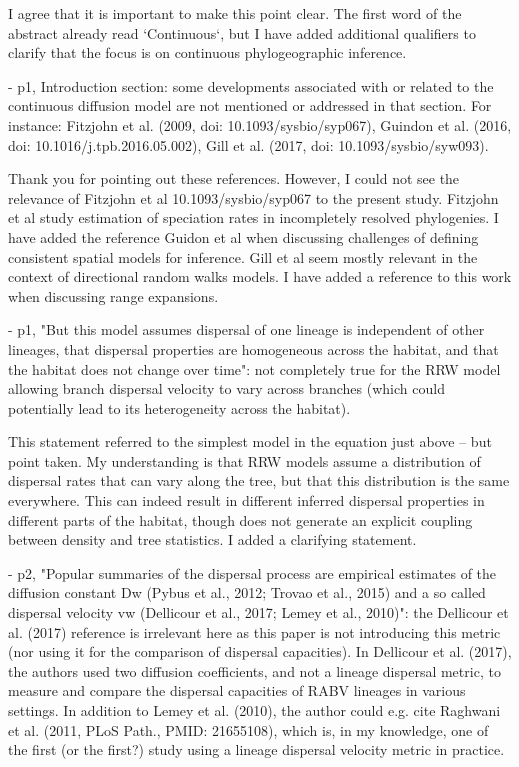 \documentclass[11pt, oneside]{article}   	%
\newcommand{\response}[1]{{\color{black}{\bf Response:} #1}}
\begin{document}
\response{I agree that it is important to make this point clear. The first word of the abstract already read `Continuous`, but I have added additional qualifiers to clarify that the focus is on continuous phylogeographic inference.}

- p1, Introduction section: some developments associated with or related to the continuous diffusion model are not mentioned or addressed in that section. For instance: Fitzjohn et al. (2009, doi: 10.1093/sysbio/syp067), Guindon et al. (2016, doi: 10.1016/j.tpb.2016.05.002), Gill et al. (2017, doi: 10.1093/sysbio/syw093).

\response{Thank you for pointing out these references. However, I could not see the relevance of Fitzjohn et al 10.1093/sysbio/syp067 to the present study. Fitzjohn et al study estimation of speciation rates in incompletely resolved phylogenies. I have added the reference Guidon et al when discussing challenges of defining consistent spatial models for inference. Gill et al seem mostly relevant in the context of directional random walks models. I have added a reference to this work when discussing range expansions.}

- p1, "But this model assumes dispersal of one lineage is independent of other lineages, that dispersal properties are homogeneous across the habitat, and that the habitat does not change over time": not completely true for the RRW model allowing branch dispersal velocity to vary across branches (which could potentially lead to its heterogeneity across the habitat).

\response{This statement referred to the simplest model in the equation just above -- but point taken. My understanding is that RRW models assume a distribution of dispersal rates that can vary along the tree, but that this distribution is the same everywhere. This can indeed result in different inferred dispersal properties in different parts of the habitat, though does not generate an explicit coupling between density and tree statistics. I added a clarifying statement. }


- p2, "Popular summaries of the dispersal process are empirical estimates of the diffusion constant Dw (Pybus et al., 2012; Trovao et al., 2015) and a so called dispersal velocity vw (Dellicour et al., 2017; Lemey et al., 2010)": the Dellicour et al. (2017) reference is irrelevant here as this paper is not introducing this metric (nor using it for the comparison of dispersal capacities). In Dellicour et al. (2017), the authors used two diffusion coefficients, and not a lineage dispersal metric, to measure and compare the dispersal capacities of RABV lineages in various settings. In addition to Lemey et al. (2010), the author could e.g. cite Raghwani et al. (2011, PLoS Path., PMID: 21655108), which is, in my knowledge, one of the first (or the first?) study using a lineage dispersal velocity metric in practice.
\end{document}
